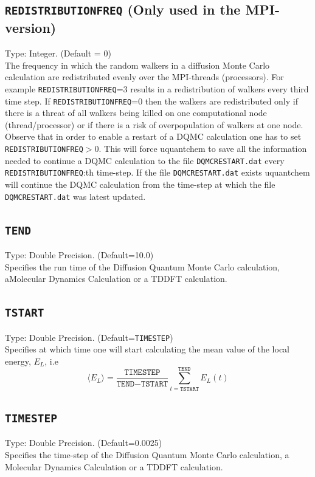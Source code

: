 \documentclass[a4paper,twoside,openany]{book}
\begin{document}
{{\subsection{\texttt{REDISTRIBUTIONFREQ} (Only used in the MPI-version)}
Type: Integer. (Default = 0)\\
The frequency in which the random walkers in a diffusion Monte Carlo calculation are redistributed evenly over the MPI-threads  (processors). For example 
 \texttt{REDISTRIBUTIONFREQ}=3 results in a redistribution of walkers every third time step. If  \texttt{REDISTRIBUTIONFREQ}=0 then the walkers are redistributed only 
 if there is a threat of all walkers being killed on one computational node (thread/processor) or if there is a risk of overpopulation of walkers at one node. Observe that in order
 to enable a restart of a DQMC calculation one has to set  \texttt{REDISTRIBUTIONFREQ}$>$0. This will force uquantchem to save all the information needed to continue a
 DQMC calculation to the file  \texttt{DQMCRESTART.dat} every \texttt{REDISTRIBUTIONFREQ}:th time-step. If the file  \texttt{DQMCRESTART.dat} exists uquantchem will 
 continue the  DQMC calculation from the time-step at which the file \texttt{DQMCRESTART.dat} was latest updated.

\subsection{\texttt{TEND}}
Type: Double Precision. (Default=10.0)\\
Specifies the run time of the Diffusion Quantum Monte Carlo calculation, aMolecular Dynamics Calculation or a TDDFT calculation.

\subsection{\texttt{TSTART}}
Type: Double Precision. (Default=\texttt{TIMESTEP})\\
Specifies at which time one will start calculating the mean value of the local energy, $E_{L}$, i.e 
\begin{equation}
\langle E_{L} \rangle = \frac{\texttt{TIMESTEP}}{\texttt{TEND}-\texttt{TSTART}}\sum_{t = \texttt{TSTART}}^\texttt{TEND}E_{L}(t)
 \end{equation}

\subsection{\texttt{TIMESTEP}}
Type: Double Precision. (Default=0.0025)\\
Specifies the time-step of the Diffusion Quantum Monte Carlo calculation, a Molecular Dynamics Calculation or a TDDFT calculation.

}}
\end{document}
